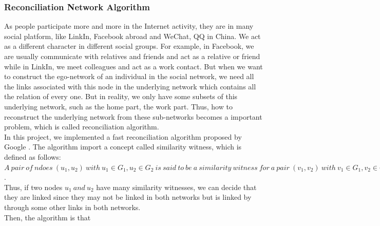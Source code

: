 \documentclass{article}
\begin{document}
\subsubsection{Reconciliation Network Algorithm}
As people participate more and more in the Internet activity, they are in many social platform, like LinkIn, Facebook abroad and WeChat, QQ in China. We act as a different character in different social groups. For example, in Facebook, we are usually communicate with relatives and friends and act as a relative or friend while in LinkIn, we meet colleagues and act as a work contact. But when we want to construct the ego-network of an individual in the social network, we need all the links associated with this node in the underlying network which contains all the relation of every one. But in reality, we only have some subsets of this underlying network, such as the home part, the work part. Thus, how to reconstruct the underlying network from these sub-networks becomes a important problem, which is called reconciliation algorithm.\\
In this project, we implemented a fast reconciliation algorithm proposed by Google \cite{cite:efficient}. The algorithm import a concept called similarity witness, which is defined as follows: \\
$A\ pair\ of\ ndoes\ (u_1, u_2)\ with\ u_1\in G_1,u_2\in G_2\ is\ said\ to\ be\ a\ similarity\ witness\ for\ a\ pair\ (v_1, v_2)\ with\ v_1\in G_1,v_2\in G_2, if\ u_1\in N_1(v_1),u_2\in N_2(v_2)\ and\ u_1\ has\ been\ linked\ to / identified\ with\ u_2$.\\
Thus, if two nodes $u_1\ and\ u_2$ have many similarity witnesses, we can decide that they are linked since they may not be linked in both networks but is linked by through some other links in both networks. \\
Then, the algorithm is that \\
\end{document}
